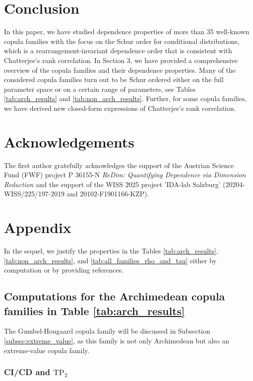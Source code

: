 \documentclass{article}
\newcommand{\TP}{\mathrm{TP_2}}
\begin{document}
\section*{Conclusion}

In this paper, we have studied dependence properties of more than 35 well-known copula families with the focus on the Schur order for conditional distributions, which is a rearrangement-invariant dependence order that is consistent with Chatterjee's rank correlation.
In Section 3, we have provided a comprehensive overview of the copula families and their dependence properties.
Many of the considered copula families turn out to be Schur ordered either on the full parameter space or on a certain range of parameters, see Tables \ref{tab:arch_results} and \ref{tab:non_arch_results}.
Further, for some copula families, we have derived new closed-form expressions of Chatterjee's rank correlation.

\section*{Acknowledgements}
The first author gratefully acknowledges the support of the Austrian Science Fund (FWF) project
{P 36155-N} \emph{ReDim: Quantifying Dependence via Dimension Reduction}
and the support of the WISS 2025 project 'IDA-lab Salzburg' (20204-WISS/225/197-2019 and 20102-F1901166-KZP).
\appendix

\section{Appendix}
\label{sec:appendix}

In the sequel, we justify the properties in the Tables \ref{tab:arch_results}, \ref{tab:non_arch_results}, and \ref{tab:all_families_rho_and_tau} either by computation or by providing references.

\subsection{Computations for the Archimedean copula families in Table \ref{tab:arch_results}}
\label{subsec:archimedean}

The Gumbel-Hougaard copula family will be discussed in Subsection \ref{subsec:extreme_value}, as this family is not only Archimedean but also an extreme-value copula family.

\subsubsection{CI/CD and $\TP$}
\label{subsubsec:archimedean_ci_and_TP2}
\end{document}
